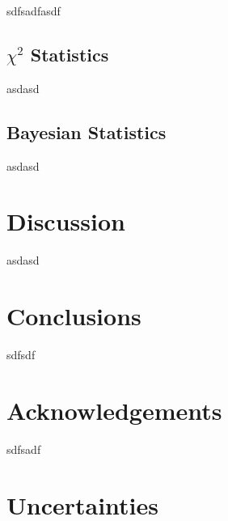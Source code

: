 \documentclass[twocolumn]{revtex4}
\begin{document}
sdfsadfasdf

\vspace{-3ex}
\subsection{$\chi^2$ Statistics} 
\vspace{-2ex}

asdasd

\vspace{-3ex}
\subsection{Bayesian Statistics} 
\vspace{-2ex}

asdasd

\vspace{-3ex}
\section{Discussion}
\vspace{-2ex}

asdasd

\vspace{-5ex}
\section{Conclusions}
\vspace{-2ex}

sdfsdf

\vspace{-5ex}
\section{Acknowledgements}
\vspace{-2ex}

sdfsadf

\vspace{-3ex}



\clearpage
\appendix

\vfill
\twocolumngrid
\vspace{-3ex}
\section{Uncertainties}
\vspace{-2ex}



\clearpage
\end{document}
